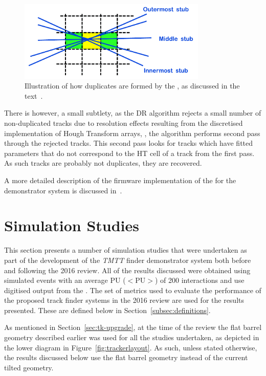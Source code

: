 \begin{figure}[!h]
\centering
\includegraphics[width=0.80\textwidth]{figs/tk-upgrade/A50_algo.pdf}
\caption{Illustration of how duplicates are formed by the \rphi \HT, as discussed in the text~\cite{TMTT_JINST}.}
\label{fig:DR}
\end{figure}

There is however, a small subtlety, as the DR algorithm rejects a small number of non-duplicated tracks due to resolution effects resulting from the discretised implementation of Hough Transform arrays, , the algorithm performs second pass through the rejected tracks.
This second pass looks for tracks which have fitted parameters that do not correspond to the HT cell of a track from the first pass.
As such tracks are probably not duplicates, they are recovered.

A more detailed description of the firmware implementation of the \DR for the demonstrator system is discussed in~\cite{TMTT_JINST}.

\section{Simulation Studies}\label{sec:TmttSimStudies}
This section presents a number of simulation studies that were undertaken as part of the development of the \emph{TMTT} finder demonstrator system both before and following the 2016 review.
All of the results discussed were obtained using simulated \ttbar events with an average PU ($<\textrm{PU}>$) of 200 interactions and use digitised output from the \HT.
The set of metrics used to evaluate the performance of the proposed track finder systems in the 2016 review are used for the results presented.
These are defined below in Section~\ref{subsec:definitions}.

As mentioned in Section~\ref{sec:tk-upgrade}, at the time of the review the flat barrel geometry described earlier was used for all the studies undertaken, as depicted in the lower diagram in Figure~\ref{fig:trackerlayout}.
As such, unless stated otherwise, the results discussed below use the flat barrel geometry instead of the current tilted geometry.

